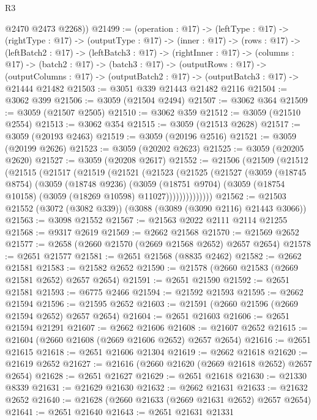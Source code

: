 \begin{lexlean}{R3}
\begin{coremodule}
        @2470
        @2473
        @2268))
@21499 := (operation : @17) ->
  (leftType : @17) ->
  (rightType : @17) ->
  (outputType : @17) ->
  (inner : @17) ->
  (rows : @17) ->
  (leftBatch2 : @17) ->
  (leftBatch3 : @17) ->
  (rightInner : @17) ->
  (columns : @17) ->
  (batch2 : @17) ->
  (batch3 : @17) ->
  (outputRows : @17) ->
  (outputColumns : @17) -> (outputBatch2 : @17) -> (outputBatch3 : @17) -> @21444 @21482
@21503 := @3051 @339 @21443 @21482 @2116
@21504 := @3062 @399
@21506 := @3059 (@21504 @2494)
@21507 := @3062 @364
@21509 := @3059 (@21507 @2505)
@21510 := @3062 @359
@21512 := @3059 (@21510 @2554)
@21513 := @3062 @354
@21515 := @3059 (@21513 @2628)
@21517 := @3059 (@20193 @2463)
@21519 := @3059 (@20196 @2516)
@21521 := @3059 (@20199 @2626)
@21523 := @3059 (@20202 @2623)
@21525 := @3059 (@20205 @2620)
@21527 := @3059 (@20208 @2617)
@21552 := @21506
    (@21509
      (@21512
        (@21515
          (@21517
            (@21519
              (@21521
                (@21523
                  (@21525
                    (@21527
                      (@3059
                        (@18745 @8754)
                        (@3059
                          (@18748 @9236)
                          (@3059
                            (@18751 @9704)
                            (@3059 (@18754 @10158) (@3059 (@18269 @10598) @11027))))))))))))))
@21562 := @21503 @21552 (@3072 (@3082 @339)) (@3088 (@3089 (@3090 @2116) @21443 @3066))
@21563 := @3098 @21552
@21567 := @21563 @2022 @2111 @2114 @21255
@21568 := @9317 @2619
@21569 := @2662 @21568
@21570 := @21569 @2652
@21577 := @2658 (@2660 @21570 (@2669 @21568 @2652) @2657 @2654)
@21578 := @2651 @21577
@21581 := @2651 @21568 (@8835 @2462)
@21582 := @2662 @21581
@21583 := @21582 @2652
@21590 := @21578 (@2660 @21583 (@2669 @21581 @2652) @2657 @2654)
@21591 := @2651 @21590
@21592 := @2651 @21581
@21593 := @6775 @2466
@21594 := @21592 @21593
@21595 := @2662 @21594
@21596 := @21595 @2652
@21603 := @21591 (@2660 @21596 (@2669 @21594 @2652) @2657 @2654)
@21604 := @2651 @21603
@21606 := @2651 @21594 @21291
@21607 := @2662 @21606
@21608 := @21607 @2652
@21615 := @21604 (@2660 @21608 (@2669 @21606 @2652) @2657 @2654)
@21616 := @2651 @21615
@21618 := @2651 @21606 @21304
@21619 := @2662 @21618
@21620 := @21619 @2652
@21627 := @21616 (@2660 @21620 (@2669 @21618 @2652) @2657 @2654)
@21628 := @2651 @21627
@21629 := @2651 @21618
@21630 := @21330 @8339
@21631 := @21629 @21630
@21632 := @2662 @21631
@21633 := @21632 @2652
@21640 := @21628 (@2660 @21633 (@2669 @21631 @2652) @2657 @2654)
@21641 := @2651 @21640
@21643 := @2651 @21631 @21331

\end{coremodule}
\end{lexlean}

